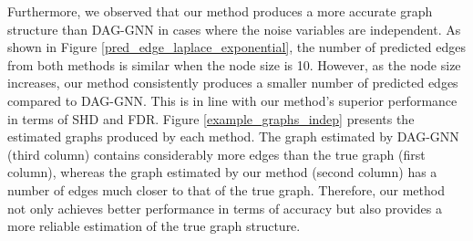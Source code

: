 \documentclass[10pt]{article}
\begin{document}
Furthermore, we observed that our method produces a more accurate graph structure than DAG-GNN in cases where the noise variables are independent. As shown in Figure \ref*{pred_edge_laplace_exponential}, the number of predicted edges from both methods is similar when the node size is 10. However, as the node size increases, our method consistently produces a smaller number of predicted edges compared to DAG-GNN. This is in line with our method's superior performance in terms of SHD and FDR. Figure \ref*{example_graphs_indep} presents the estimated graphs produced by each method. The graph estimated by DAG-GNN (third column) contains considerably more edges than the true graph (first column), whereas the graph estimated by our method (second column) has a number of edges much closer to that of the true graph. Therefore, our method not only achieves better performance in terms of accuracy but also provides a more reliable estimation of the true graph structure.\\
\end{document}
